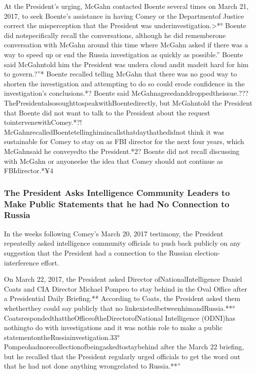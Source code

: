 At the President’s urging, McGahn contacted Boente several times on March 21, 2017, to seek Boente’s assistance in having Comey or the Departmentof Justice correct the misperception that the President was underinvestigation.>*°
Boente did notspecifically recall the conversations, although he did rememberone conversation with McGahn around this time where McGahn asked if there was a way to speed up or end the Russia investigation as quickly as possible.”
Boente said McGahntold him the President was undera cloud andit madeit hard for him to govern.?”*
Boente recalled telling McGahn that there was no good way to shorten the investigation and attempting to do so could erode confidence in the investigation’s conclusions.*?
Boente said McGahnagreedanddroppedtheissue.???
ThePresidentalsosoughttospeakwithBoentedirectly, but McGahntold the President that Boente did not want to talk to the President about the request tointervenewithComey.*?!
McGahnrecalledBoentetellinghimincallsthatdaythathedidnot think it was sustainable for Comey to stay on as FBI director for the next four years, which McGahnsaid he conveyedto the President.*2?
Boente did not recall discussing with McGahn or anyoneelse the idea that Comey should not continue as FBIdirector.*¥4

\subsubsection{The President Asks Intelligence Community Leaders to Make Public Statements that he had No Connection to Russia}

In the weeks following Comey’s March 20, 2017 testimony, the President repeatedly asked intelligence community officials to push back publicly on any suggestion that the President had a connection to the Russian election-interference effort.

On March 22, 2017, the President asked Director ofNationalIntelligence Daniel Coats and CIA Director Michael Pompeo to stay behind in the Oval Office after a Presidential Daily Briefing.**
According to Coats, the President asked them whetherthey could say publicly that no linkexistedbetweenhimandRussia.**°
CoatsrespondedthattheOfficeoftheDirectorofNational Intelligence (ODNI)has nothingto do with investigations and it was nothis role to make a public statementontheRussiainvestigation.33°
Pompeohadnorecollectionofbeingaskedtostaybehind after the March 22 briefing, but he recalled that the President regularly urged officials to get the word out that he had not done anything wrongrelated to Russia.**”

